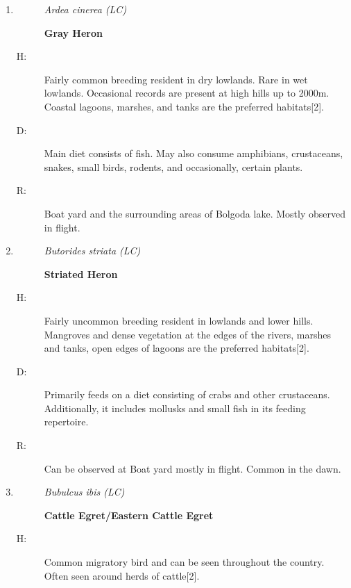 \begin{itemize}
\begin{enumerate}
\begin{description}
\end{description}%
\item%
\begin{description}%
\item[]%
\textit{Ardea cinerea (LC)}%
\item[]%
\textbf{Gray Heron}%
\end{description}%
\begin{description}%
\item[H: ]%
Fairly common breeding resident in dry lowlands. Rare in wet lowlands. Occasional records are present at high hills up to 2000m. Coastal lagoons, marshes, and tanks are the preferred habitats{[}2{]}.%
\item[D: ]%
Main diet consists of fish. May also consume amphibians, crustaceans, snakes, small birds, rodents, and occasionally, certain plants.%
\item[R: ]%
Boat yard and the surrounding areas of Bolgoda lake. Mostly observed in flight.%
\end{description}%
\item%
\begin{description}%
\item[]%
\textit{Butorides striata (LC)}%
\item[]%
\textbf{Striated Heron}%
\end{description}%
\begin{description}%
\item[H: ]%
Fairly uncommon breeding resident in lowlands and lower hills. Mangroves and dense vegetation at the edges of the rivers, marshes and tanks, open edges of lagoons are the preferred habitats{[}2{]}.%
\newpage
\item[D: ]%
Primarily feeds on a diet consisting of crabs and other crustaceans. Additionally, it includes mollusks and small fish in its feeding repertoire.%
\item[R: ]%
Can be observed at Boat yard mostly in flight. Common in the dawn.%
\end{description}%
\item%
\begin{description}%
\item[]%
\textit{Bubulcus ibis (LC)}%
\item[]%
\textbf{Cattle Egret/Eastern Cattle Egret}%
\end{description}%
\begin{description}%
\item[H: ]%
Common migratory bird and can be seen throughout the country. Often seen around herds of cattle{[}2{]}.%

\end{description}
\end{enumerate}
\end{itemize}
